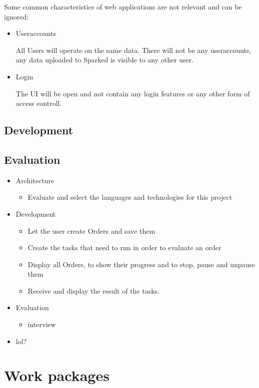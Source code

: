 \documentclass[12pt,a4paper,titlepage,oneside,BCOR1cm]{scrreprt}
\begin{document}
Some common characteristics of web applications are not relevant and can be ignored:
\begin{itemize}
  \item Useraccounts

  All Users will operate on the same data. There will not be any useraccounts, any data uploaded to Sparked is visible to any other user.
  \item Login

  The UI will be open and not contain any login features or any other form of access controll.
\end{itemize}

\section{Development}

\section{Evaluation}


\begin{itemize}
  \item Architecture
    \begin{itemize}
      \item Evaluate and select the languages and technologies for this project
    \end{itemize}
  \item Development
    \begin{itemize}
      \item Let the user create Orders and save them
      \item Create the tasks that need to run in order to evaluate an order
      \item Display all Orders, to show their progress and to stop, pause and unpause them
      \item Receive and display the result of the tasks.
      
    \end{itemize}
  \item Evaluation
    \begin{itemize}
      \item interview
    \end{itemize}
  \item lol?


\end{itemize}

\chapter{Work packages}
\end{document}
